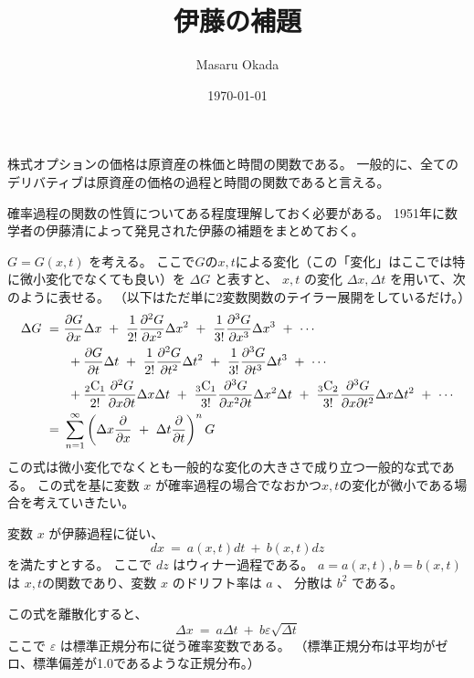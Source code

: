 \documentclass[uplatex,a4j,12pt,dvipdfmx]{jsarticle}
\title{
伊藤の補題
}
\author{Masaru Okada}
\date{\today}
\begin{document}
\maketitle

株式オプションの価格は原資産の株価と時間の関数である。
一般的に、全てのデリバティブは原資産の価格の過程と時間の関数であると言える。

確率過程の関数の性質についてある程度理解しておく必要がある。
1951年に数学者の伊藤清によって発見された伊藤の補題をまとめておく。

$G=G(x,t)$ を考える。
ここで$G$の$x,t$による変化（この「変化」はここでは特に微小変化でなくても良い）を $\Delta G$ と表すと、 $x,t$ の変化 $\Delta x, \Delta t$ を用いて、次のように表せる。
（以下はただ単に2変数関数のテイラー展開をしているだけ。）
\begin{align}
	\Delta G
	\ = & \
	\dfrac{\partial G}{\partial x} \Delta x
	\ + \
	\dfrac{1}{2!} \dfrac{\partial^{2} G}{\partial x^{2}} \Delta x^{2}
	\ + \
	\dfrac{1}{3!} \dfrac{\partial^{3} G}{\partial x^{3}} \Delta x^{3}
	\ + \
	\cdots
	\\
	    & \ \ +
	\dfrac{\partial G}{\partial t} \Delta t
	\ + \
	\dfrac{1}{2!} \dfrac{\partial^{2} G}{\partial t^{2}} \Delta t^{2}
	\ + \
	\dfrac{1}{3!} \dfrac{\partial^{3} G}{\partial t^{3}} \Delta t^{3}
	\ + \
	\cdots
	\\
	    & \ \ +
	\dfrac{ {}_2 {\rm C}_{1} }{2!}
	\dfrac{\partial^{2} G}{\partial x \partial t } \Delta x \Delta t
	\ + \
	\dfrac{ {}_3 {\rm C}_{1} }{3!}
	\dfrac{\partial^{3} G}{\partial x^{2} \partial t } \Delta x^{2} \Delta t
	\ + \
	\dfrac{ {}_3 {\rm C}_{2} }{3!}
	\dfrac{\partial^{3} G}{\partial x \partial t^{2} } \Delta x \Delta t^{2}
	\ + \
	\cdots
	\\
	\ = & \
	\sum_{n=1}^{\infty}
	\left(
	\Delta x
	\dfrac{\partial}{\partial x}
	\ + \
	\Delta t
	\dfrac{\partial}{\partial t}
	\right)^{n}
	G
\end{align}
この式は微小変化でなくとも一般的な変化の大きさで成り立つ一般的な式である。
この式を基に変数 $x$ が確率過程の場合でなおかつ$x,t$の変化が微小である場合を考えていきたい。

変数 $x$ が伊藤過程に従い、
$$
	dx
	\ = \
	a(x,t)dt
	\ + \
	b(x,t)dz
$$
を満たすとする。
ここで $dz$ はウィナー過程である。
$a=a(x,t),b=b(x,t)$ は $x,t$の関数であり、変数 $x$ のドリフト率は $a$ 、 分散は $b^{2}$ である。

この式を離散化すると、
$$
	\Delta x
	\ = \
	a \Delta t
	\ + \
	b \varepsilon \sqrt{\Delta t}
$$
ここで $\varepsilon$ は標準正規分布に従う確率変数である。
（標準正規分布は平均がゼロ、標準偏差が1.0であるような正規分布。）
\end{document}
